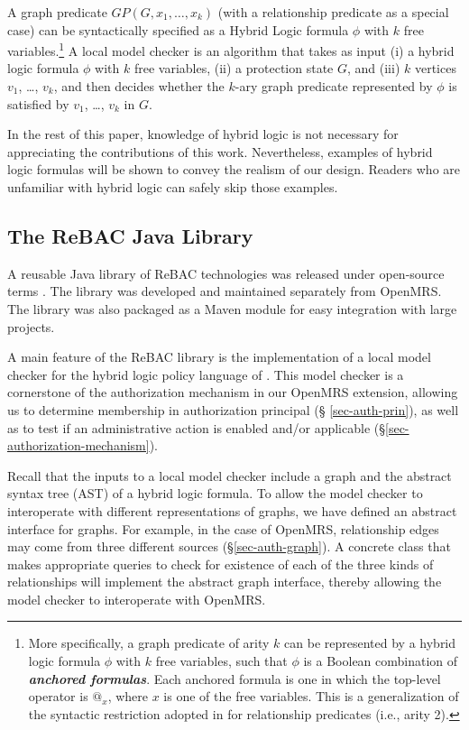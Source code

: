 \documentclass{acm_proc_article-sp}
\newcommand{\Dfn}[1]{\textbf{\emph{#1}}}
\begin{document}
A graph predicate $\mathit{GP}(G, x_1, \ldots, x_k)$ (with a
relationship predicate as a special case) can be syntactically
specified as a Hybrid Logic formula $\phi$ \cite{Bruns-etal:2012} with
$k$ free variables.\footnote{ More specifically, a graph predicate of
  arity $k$ can be represented by a hybrid logic formula $\phi$ with
  $k$ free variables, such that $\phi$ is a Boolean combination of
  \Dfn{anchored formulas}.  Each anchored formula is one in which the
  top-level operator is $@_x$, where $x$ is one of the free variables.
  This is a generalization of the syntactic restriction adopted in
  \cite{Bruns-etal:2012} for relationship predicates (i.e., arity 2).
} A local model checker is an algorithm that takes as input (i) a
hybrid logic formula $\phi$ with $k$ free variables, (ii) a protection
state $G$, and (iii) $k$ vertices $v_1$, \ldots, $v_k$, and then
decides whether the $k$-ary graph predicate represented by $\phi$ is
satisfied by $v_1$, \ldots, $v_k$ in $G$.

In the rest of this paper, knowledge of hybrid logic is not necessary
for appreciating the contributions of this work.  Nevertheless,
examples of hybrid logic formulas will be shown to convey the realism
of our design.  Readers who are unfamiliar with hybrid logic can
safely skip those examples.

\subsection{The ReBAC Java Library}

A reusable Java library of ReBAC technologies was released under
open-source terms \cite{ReBACLib}.  The library was developed and
maintained separately from OpenMRS.  The library was also packaged as a
Maven module for easy integration with large projects.

A main feature of the ReBAC library is the implementation of a local
model checker for the hybrid logic policy language of
\cite{Bruns-etal:2012}.  This model checker is a cornerstone of the
authorization mechanism in our OpenMRS extension, allowing us to
determine membership in authorization principal (\S
\ref{sec-auth-prin}), as well as to test if an administrative action
is enabled and/or applicable (\S \ref{sec-authorization-mechanism}).

Recall that the inputs to a local model checker include a graph and
the abstract syntax tree (AST) of a hybrid logic formula.  To allow
the model checker to interoperate with different representations of
graphs, we have defined an abstract interface for graphs.  For
example, in the case of OpenMRS, relationship edges may come from
three different sources (\S \ref{sec-auth-graph}).  A concrete class
that makes appropriate queries to check for existence of each of the
three kinds of relationships will implement the abstract graph
interface, thereby allowing the model checker to interoperate with OpenMRS.
\end{document}
